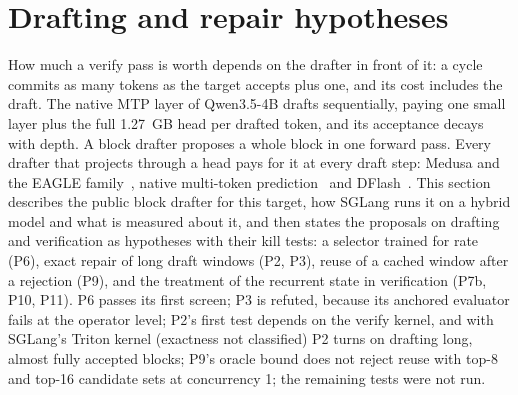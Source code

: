 \section{Drafting and repair hypotheses}\label{app:drafting}\label{sec:drafting}
How much a verify pass is worth depends on the drafter in front of it: a cycle commits as many tokens as the target accepts plus one, and its cost includes the draft. The native MTP layer of Qwen3.5-4B drafts sequentially, paying one small layer plus the full 1.27~GB head per drafted token, and its acceptance decays with depth. A block drafter proposes a whole block in one forward pass. Every drafter that projects through a head pays for it at every draft step: Medusa and the EAGLE family~\cite{medusa,eagle,eagle2,eagle3}, native multi-token prediction~\cite{gloeckle2024,deepseekv3} and DFlash~\cite{dflashpaper}. This section describes the public block drafter for this target, how SGLang runs it on a hybrid model and what is measured about it, and then states the proposals on drafting and verification as hypotheses with their kill tests: a selector trained for rate (P6), exact repair of long draft windows (P2, P3), reuse of a cached window after a rejection (P9), and the treatment of the recurrent state in verification (P7b, P10, P11). P6 passes its first screen; P3 is refuted, because its anchored evaluator fails at the operator level; P2's first test depends on the verify kernel, and with SGLang's Triton kernel (exactness not classified) P2 turns on drafting long, almost fully accepted blocks; P9's oracle bound does not reject reuse with top-8 and top-16 candidate sets at concurrency 1; the remaining tests were not run.

